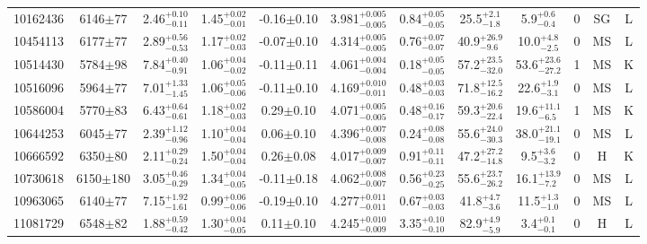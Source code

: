 \begin{landscape}
\begin{longtable}{c|ccccc|ccc|ccc}
	10162436 & 6146$\pm$77   & 2.46$_{-0.11}^{+0.10}$    & 1.45$_{-0.01}^{+0.02}$ & -0.16$\pm$0.10    & 3.981$_{-0.005}^{+0.005}$ & 0.84$_{-0.05}^{+0.05}$ & 25.5$_{-1.8}^{+2.1}$      & 5.9$_{-0.4}^{+0.6}$      & 0 &        SG & L \\
	10454113 & 6177$\pm$77   & 2.89$_{-0.53}^{+0.56}$    & 1.17$_{-0.03}^{+0.02}$ & -0.07$\pm$0.10    & 4.314$_{-0.005}^{+0.005}$ & 0.76$_{-0.07}^{+0.07}$ & 40.9$_{-9.6}^{+26.9}$     & 10.0$_{-2.5}^{+4.8}$     & 0 &        MS & L \\
	10514430 & 5784$\pm$98   & 7.84$_{-0.91}^{+0.40}$    & 1.06$_{-0.02}^{+0.04}$ & -0.11$\pm$0.11    & 4.061$_{-0.004}^{+0.004}$ & 0.18$_{-0.05}^{+0.05}$ & 57.2$_{-32.0}^{+23.5}$    & 53.6$_{-27.2}^{+23.6}$   & 1 &        MS & K \\
	10516096 & 5964$\pm$77   & 7.01$_{-1.45}^{+1.33}$    & 1.06$_{-0.06}^{+0.05}$ & -0.11$\pm$0.10    & 4.169$_{-0.011}^{+0.010}$ & 0.48$_{-0.03}^{+0.03}$ & 71.8$_{-16.2}^{+12.5}$    & 22.6$_{-3.1}^{+1.9}$     & 0 &        MS & L \\
	10586004 & 5770$\pm$83   & 6.43$_{-0.61}^{+0.64}$    & 1.18$_{-0.03}^{+0.02}$ & 0.29$\pm$0.10     & 4.071$_{-0.005}^{+0.005}$ & 0.48$_{-0.17}^{+0.16}$ & 59.3$_{-22.4}^{+20.6}$    & 19.6$_{-6.5}^{+11.1}$    & 1 &        MS & K \\
	10644253 & 6045$\pm$77   & 2.39$_{-0.96}^{+1.12}$    & 1.10$_{-0.04}^{+0.04}$ & 0.06$\pm$0.10     & 4.396$_{-0.008}^{+0.007}$ & 0.24$_{-0.08}^{+0.08}$ & 55.6$_{-30.3}^{+24.0}$    & 38.0$_{-19.1}^{+21.1}$   & 0 &        MS & L \\
	10666592 & 6350$\pm$80   & 2.11$_{-0.24}^{+0.29}$    & 1.50$_{-0.04}^{+0.04}$ & 0.26$\pm$0.08     & 4.017$_{-0.007}^{+0.009}$ & 0.91$_{-0.11}^{+0.11}$ & 47.2$_{-14.8}^{+27.2}$    & 9.5$_{-3.2}^{+3.6}$      & 0 &        H & K \\
	10730618 & 6150$\pm$180  & 3.05$_{-0.29}^{+0.46}$    & 1.34$_{-0.05}^{+0.04}$ & -0.11$\pm$0.18    & 4.062$_{-0.007}^{+0.008}$ & 0.56$_{-0.25}^{+0.23}$ & 55.6$_{-26.2}^{+23.7}$    & 16.1$_{-7.2}^{+13.9}$    & 0 &        MS & L \\
	10963065 & 6140$\pm$77   & 7.15$_{-1.61}^{+1.92}$    & 0.99$_{-0.06}^{+0.06}$ & -0.19$\pm$0.10    & 4.277$_{-0.011}^{+0.011}$ & 0.67$_{-0.03}^{+0.03}$ & 41.8$_{-3.6}^{+4.7}$      & 11.5$_{-1.0}^{+1.3}$     & 0 &        MS & L \\
	11081729 & 6548$\pm$82   & 1.88$_{-0.42}^{+0.59}$    & 1.30$_{-0.05}^{+0.04}$ & 0.11$\pm$0.10     & 4.245$_{-0.009}^{+0.010}$ & 3.35$_{-0.10}^{+0.10}$ & 82.9$_{-5.9}^{+4.9}$      & 3.4$_{-0.1}^{+0.1}$      & 0 &        H & L \\

\end{longtable}
\end{landscape}

